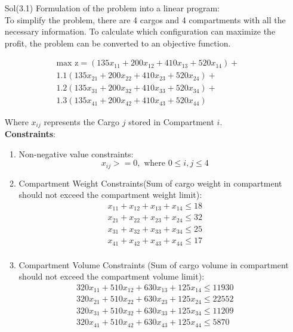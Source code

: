 \documentclass[unicode,11pt,a4paper,oneside,numbers=endperiod,openany]{scrartcl}
\begin{document}
\begin{enumerate}
 \item[Sol(3.1)]Formulation of the problem into a linear program: \\
 
 To simplify the problem, there are 4 cargos and 4 compartments with all the necessary information. To calculate which configuration can maximize the profit, the problem can be converted to an objective function.
 
 \begin{center}
\begin{equation*}
\begin{aligned}
\text{max z}= (135x_{11} + 200x_{12} + 410x_{13} + 520x_{14}) +\\
 1.1(135x_{21} + 200x_{22} + 410x_{23} + 520x_{24}) + \\
 1.2(135x_{31} + 200x_{32} + 410x_{33} + 520x_{34}) + \\
 1.3(135x_{41} + 200x_{42} + 410x_{43} + 520x_{44}) 
\end{aligned}
\end{equation*}

\end{center}

Where ${x_{ij}}$ represents the Cargo ${j}$ stored in Compartment ${i}$. \\

\textbf{Constraints}:
\begin{enumerate}
 \item Non-negative value constraints:
 \begin{equation*}
  x_{ij} >= 0, \text{ where } 0 \leq i,j \leq 4
 \end{equation*}
 \item Compartment Weight Constraints(Sum of cargo weight in compartment should not exceed the compartment weight limit):
 \begin{equation*}
  \begin{aligned}
   x_{11} + x_{12} + x_{13} + x_{14} \leq 18 \\
   x_{21} + x_{22} + x_{23} + x_{24} \leq 32 \\
   x_{31} + x_{32} + x_{33} + x_{34} \leq 25 \\
   x_{41} + x_{42} + x_{43} + x_{44} \leq 17 \\
  \end{aligned}
 \end{equation*}
 \item Compartment Volume Constraints (Sum of cargo volume in compartment should not exceed the compartment volume limit):
 \begin{equation*}
  \begin{aligned}
   320x_{11} + 510x_{12} + 630x_{13} + 125x_{14} \leq 11930 \\
   320x_{21} + 510x_{22} + 630x_{23} + 125x_{24} \leq 22552 \\
   320x_{31} + 510x_{32} + 630x_{33} + 125x_{34} \leq 11209 \\
   320x_{41} + 510x_{42} + 630x_{43} + 125x_{44} \leq 5870 \\
  \end{aligned}
 \end{equation*}
 

\end{enumerate}
\end{enumerate}
\end{document}
